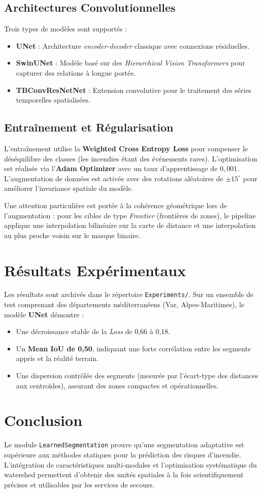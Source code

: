 \documentclass[11pt,a4paper]{article}
\begin{document}
\subsection{Architectures Convolutionnelles}
Trois types de modèles sont supportés :
\begin{itemize}
    \item \textbf{UNet} : Architecture \textit{encoder-decoder} classique avec connexions résiduelles.
    \item \textbf{SwinUNet} : Modèle basé sur des \textit{Hierarchical Vision Transformers} pour capturer des relations à longue portée.
    \item \textbf{TBConvResNetNet} : Extension convolutive pour le traitement des séries temporelles spatialisées.
\end{itemize}

\subsection{Entraînement et Régularisation}
L'entraînement utilise la \textbf{Weighted Cross Entropy Loss} pour compenser le déséquilibre des classes (les incendies étant des événements rares). L'optimisation est réalisée via l'\textbf{Adam Optimizer} avec un taux d'apprentissage de $0,001$.
L'augmentation de données est activée avec des rotations aléatoires de $\pm 15^\circ$ pour améliorer l'invariance spatiale du modèle.

Une attention particulière est portée à la cohérence géométrique lors de l'augmentation : pour les cibles de type \textit{Frontier} (frontières de zones), le pipeline applique une interpolation bilinéaire sur la carte de distance et une interpolation au plus proche voisin sur le masque binaire.

\section{Résultats Expérimentaux}
Les résultats sont archivés dans le répertoire \texttt{Experiments/}. Sur un ensemble de test comprenant des départements méditerranéens (Var, Alpes-Maritimes), le modèle \textbf{UNet} démontre :
\begin{itemize}
    \item Une décroissance stable de la \textit{Loss} de 0,66 à 0,18.
    \item Un \textbf{Mean IoU de 0,50}, indiquant une forte corrélation entre les segments appris et la réalité terrain.
    \item Une dispersion contrôlée des segments (mesurée par l'écart-type des distances aux centroïdes), assurant des zones compactes et opérationnelles.
\end{itemize}

\section{Conclusion}
Le module \texttt{LearnedSegmentation} prouve qu'une segmentation adaptative est supérieure aux méthodes statiques pour la prédiction des risques d'incendie. L'intégration de caractéristiques multi-modales et l'optimisation systématique du watershed permettent d'obtenir des unités spatiales à la fois scientifiquement précises et utilisables par les services de secours.
\end{document}
